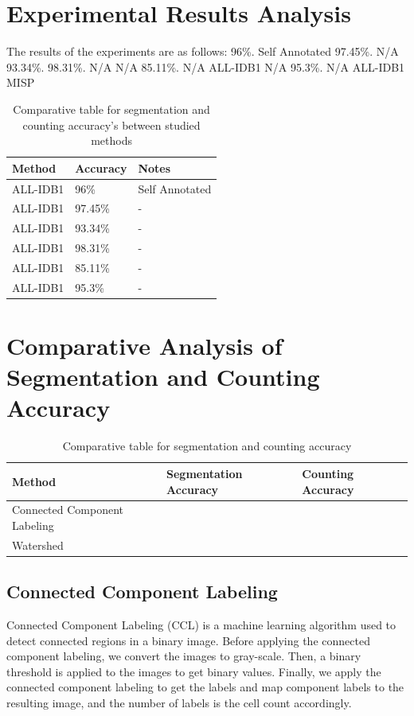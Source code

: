 \documentclass[conference]{IEEEtran}
\begin{document}
\section{Experimental Results Analysis}
The results of the experiments are as follows: 
96\%.
Self Annotated 
97.45\%.
N/A 
93.34\%.
98.31\%.
N/A 
N/A 
85.11\%.
N/A 
ALL-IDB1 
N/A 
95.3\%.
N/A 
ALL-IDB1 
MISP
\begin{table}[htbp]
\centering
\caption{Comparative table for segmentation and counting accuracy's between studied methods}
\label{tab:ComparativeTable}
\begin{tabular}{lll}
\hline
Method & Accuracy & Notes \\
\hline
ALL-IDB1 & 96\% & Self Annotated \\
ALL-IDB1 & 97.45\% & - \\
ALL-IDB1 & 93.34\% & - \\
ALL-IDB1 & 98.31\% & - \\
ALL-IDB1 & 85.11\% & - \\
ALL-IDB1 & 95.3\% & - \\
\hline
\end{tabular}
\end{table}

\section{Comparative Analysis of Segmentation and Counting Accuracy}
\begin{table}[htbp]
\centering
\caption{Comparative table for segmentation and counting accuracy}
\label{tab:comparative_table}
\begin{tabular}{lll}
\hline
Method & Segmentation Accuracy & Counting Accuracy \\
\hline
Connected Component Labeling & & \\
Watershed & & \\
\hline
\end{tabular}
\end{table}
\subsection{Connected Component Labeling}
Connected Component Labeling (CCL) is a machine learning algorithm used to detect connected regions in a binary image. Before applying the connected component labeling, we convert the images to gray-scale. Then, a binary threshold is applied to the images to get binary values. Finally, we apply the connected component labeling to get the labels and map component labels to the resulting image, and the number of labels is the cell count accordingly.
\end{document}
